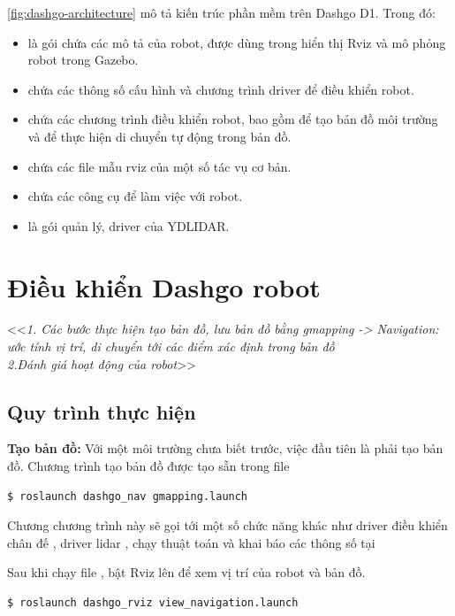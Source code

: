 \figurename{\ref{fig:dashgo-architecture}} mô tả kiến trúc phần mềm trên Dashgo D1. Trong đó:
\begin{itemize}
    \item {} là gói chứa các mô tả của robot, được dùng trong hiển thị Rviz và mô phỏng robot trong Gazebo.
    \item {} chứa các thông số cấu hình và chương trình driver để điều khiển robot.
    \item {} chứa các chương trình điều khiển robot, bao gồm  để tạo bản đồ môi trường và  để thực hiện di chuyển tự động trong bản đồ.
    \item {} chứa các file mẫu rviz của một số tác vụ cơ bản.
    \item {} chứa các công cụ để làm việc với robot.
    \item {} là gói quản lý, driver của YDLIDAR.
\end{itemize}

\section{Điều khiển Dashgo robot}
<<\textit{1. Các bước thực hiện tạo bản đồ, lưu bản đồ bằng gmapping -> Navigation: ước tính vị trí, di chuyển tới các điểm xác định trong bản đồ\\}
\textit{2.Đánh giá hoạt động của robot}>>

\subsection{Quy trình thực hiện}

\textbf{Tạo bản đồ:} Với một môi trường chưa biết trước, việc đầu tiên là phải tạo bản đồ. 
Chương trình tạo bản đồ được tạo sẵn trong file 

\begin{lstlisting}
$ roslaunch dashgo_nav gmapping.launch
\end{lstlisting}  

Chương chương trình này sẽ gọi tới một số chức năng khác như driver điều khiển chân đế , driver lidar , chạy thuật toán và khai báo các thông số tại 

Sau khi chạy file , bật Rviz lên để xem vị trí của robot và bản đồ. 
\begin{lstlisting}
$ roslaunch dashgo_rviz view_navigation.launch
\end{lstlisting}


